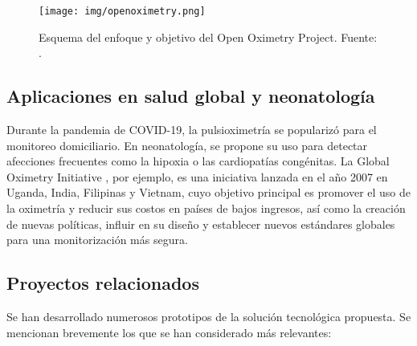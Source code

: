 \begin{figure}[H]
    \centering
    \texttt{[image: img/openoximetry.png]}
    \caption{Esquema del enfoque y objetivo del Open Oximetry Project. Fuente: \cite{elmankabadi2023openoximetry}.}
    \label{fig:openoximetry}
\end{figure}

\subsection{Aplicaciones en salud global y neonatología}

Durante la pandemia de COVID-19, la pulsioximetría se popularizó para el monitoreo domiciliario. En neonatología, se propone su uso para detectar afecciones frecuentes como la hipoxia o las cardiopatías congénitas. La Global Oximetry Initiative \cite{thoms2007global}, por ejemplo, es una iniciativa lanzada en el año 2007 en Uganda, India, Filipinas y Vietnam, cuyo objetivo principal es promover el uso de la oximetría y reducir sus costos en países de bajos ingresos, así como la creación de nuevas políticas, influir en su diseño y establecer nuevos estándares globales para una monitorización más segura.


\subsection{Proyectos relacionados}

Se han desarrollado numerosos prototipos de la solución tecnológica propuesta. Se mencionan brevemente los que se han considerado más relevantes: 


